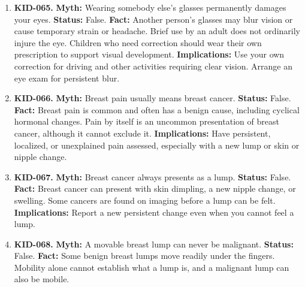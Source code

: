 \documentclass[11pt,oneside]{book}
\begin{document}
\begin{enumerate}[leftmargin=0pt,labelwidth=0pt,labelsep=0pt,itemindent=0pt]
\textbf{Fact:} Vitamin A supports normal vision, and deficiency can impair vision in dim light. Nearsightedness and farsightedness arise from the way the eye focuses light. Eating carrots cannot correct that focusing error. \cite{ref306}\newline
\textbf{Implications:} Eat a varied diet and use prescribed lenses for clear vision.
\item[] \textbf{KID-065.} \textbf{Myth:} Wearing somebody else's glasses permanently damages your eyes.\newline
\textbf{Status:} False.\newline
\textbf{Fact:} Another person's glasses may blur vision or cause temporary strain or headache. Brief use by an adult does not ordinarily injure the eye. Children who need correction should wear their own prescription to support visual development. \cite{ref306}\newline
\textbf{Implications:} Use your own correction for driving and other activities requiring clear vision. Arrange an eye exam for persistent blur.
\item[] \textbf{KID-066.} \textbf{Myth:} Breast pain usually means breast cancer.\newline
\textbf{Status:} False.\newline
\textbf{Fact:} Breast pain is common and often has a benign cause, including cyclical hormonal changes. Pain by itself is an uncommon presentation of breast cancer, although it cannot exclude it. \cite{ref311}\newline
\textbf{Implications:} Have persistent, localized, or unexplained pain assessed, especially with a new lump or skin or nipple change.
\item[] \textbf{KID-067.} \textbf{Myth:} Breast cancer always presents as a lump.\newline
\textbf{Status:} False.\newline
\textbf{Fact:} Breast cancer can present with skin dimpling, a new nipple change, or swelling. Some cancers are found on imaging before a lump can be felt. \cite{ref363}\newline
\textbf{Implications:} Report a new persistent change even when you cannot feel a lump.
\item[] \textbf{KID-068.} \textbf{Myth:} A movable breast lump can never be malignant.\newline
\textbf{Status:} False.\newline
\textbf{Fact:} Some benign breast lumps move readily under the fingers. Mobility alone cannot establish what a lump is, and a malignant lump can also be mobile. \cite{ref311}\newline

\end{enumerate}
\end{document}
